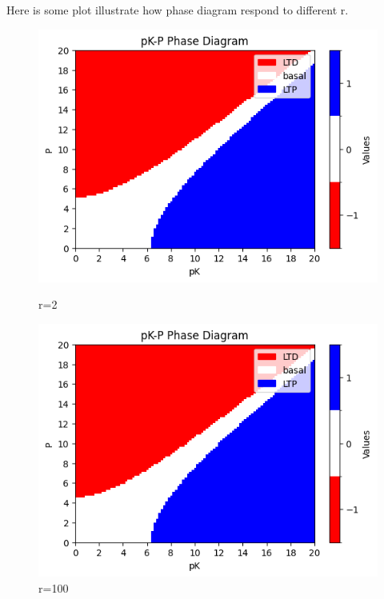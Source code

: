 \documentclass{article}
\begin{document}
Here is some plot illustrate how phase diagram respond to different r.
\begin{figure}[h]
    \centering
    \begin{minipage}[b]{0.35\textwidth}
        \includegraphics[width=1\textwidth]{phase_diagram_ratio=2.png}
        \caption{r=2}
        \label{fig:image1}
    \end{minipage}
    \hfill %
    \begin{minipage}[b]{0.35\textwidth}
        \includegraphics[width=\textwidth]{phase_diagram_ratio=100.png}
        \caption{r=100}
        \label{fig:image2}
    \end{minipage}
\end{figure}\\
\end{document}

